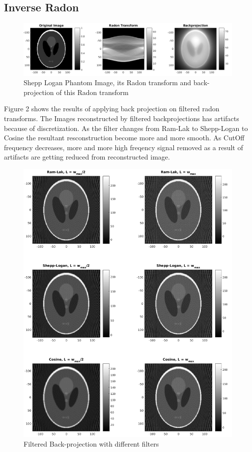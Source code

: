 \documentclass[11pt]{article}
\begin{document}
\maketitle

\subsection{Inverse Radon}
\begin{figure}[h]
\centering
\includegraphics[scale=0.4]{iradonWithoutFilter}
\caption{Shepp Logan Phantom Image, its Radon transform and back-projection of this Radon transform}
\end{figure}

Figure 2 shows the results of applying back projection on filtered radon transforms.
The Images reconstructed by filtered backprojections has artifacts because of discretization.
As the filter changes from Ram-Lak to Shepp-Logan to Cosine the resultant resconstruction become more and more smooth.
As CutOff frequency decreases, more and more high freqency signal removed as a result of artifacts are getting reduced from reconstructed image.

\begin{figure}[h]
\centering
\includegraphics[scale=0.5]{iradon}
\caption{Filtered Back-projection with different filters}
\end{figure}
\end{document}
